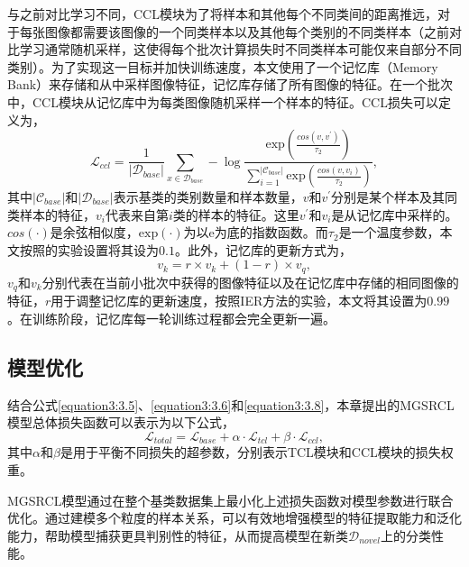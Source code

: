 与之前对比学习不同，CCL模块为了将样本和其他每个不同类间的距离推远，对于每张图像都需要该图像的一个同类样本以及其他每个类别的不同类样本（之前对比学习通常随机采样，这使得每个批次计算损失时不同类样本可能仅来自部分不同类别）。为了实现这一目标并加快训练速度，本文使用了一个记忆库（Memory Bank）来存储和从中采样图像特征，记忆库存储了所有图像的特征。在一个批次中，CCL模块从记忆库中为每类图像随机采样一个样本的特征。CCL损失可以定义为，
\begin{equation}
\label{equation3:3.8}
  \mathcal{L}_{ccl} = \frac{1}{|\mathcal{D}_{base}|}\sum_{x \in \mathcal{D}_{base}}-\log \frac{\text{exp}(\frac{cos(v, v^\prime)}{\tau_2})}{\sum_{i=1}^{|\mathcal{C}_{base}|}{\text{exp}(\frac{cos(v, v_i)}{\tau_2})}},
\end{equation}
其中$|\mathcal{C}_{base}|$和$|\mathcal{D}_{base}|$表示基类的类别数量和样本数量，$v$和$v^\prime$分别是某个样本及其同类样本的特征，$v_i$代表来自第$i$类的样本的特征。这里$v^\prime$和$v_i$是从记忆库中采样的。$cos(\cdot)$是余弦相似度，$\text{exp}(\cdot)$为以e为底的指数函数。而$\tau_2$是一个温度参数，本文按照\cite{SimCLR, SupCon}的实验设置将其设为$0.1$。此外，记忆库的更新方式为，
\begin{equation}
\label{equation3:3.9}
  v_{k} = r\times v_k + (1 - r)\times v_q,
\end{equation}
$v_q$和$v_k$分别代表在当前小批次中获得的图像特征以及在记忆库中存储的相同图像的特征，$r$用于调整记忆库的更新速度，按照IER方法\cite{IER}的实验，本文将其设置为$0.99$。在训练阶段，记忆库每一轮训练过程都会完全更新一遍。

\subsection[\hspace{-2pt}模型优化]{{\heiti{} \hspace{-8pt}模型优化}}\label{section3: 模型优化}
结合公式\ref{equation3:3.5}、\ref{equation3:3.6}和\ref{equation3:3.8}，本章提出的MGSRCL模型总体损失函数可以表示为以下公式，
\begin{equation}
\label{equation3:3.10}
  \mathcal{L}_{total} = \mathcal{L}_{base} + \alpha \cdot \mathcal{L}_{tcl} + \beta \cdot \mathcal{L}_{ccl},
\end{equation}
其中$\alpha$和$\beta$是用于平衡不同损失的超参数，分别表示TCL模块和CCL模块的损失权重。

MGSRCL模型通过在整个基类数据集上最小化上述损失函数对模型参数进行联合优化。通过建模多个粒度的样本关系，可以有效地增强模型的特征提取能力和泛化能力，帮助模型捕获更具判别性的特征，从而提高模型在新类$\mathcal{D}_{novel}$上的分类性能。


